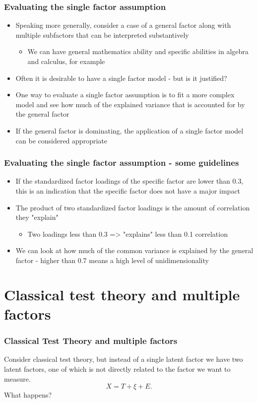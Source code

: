 \documentclass[compress]{beamer}
\begin{document}
\begin{frame}[fragile]
\frametitle{Evaluating the single factor assumption}
\begin{itemize}
\item Speaking more generally, consider a case of a general factor along with multiple subfactors that can be interpreted substantively
\begin{itemize}
\item We can have general mathematics ability and specific abilities in algebra and calculus, for example
\end{itemize} 
\item Often it is desirable to have a single factor model - but is it justified?
\item One way to evaluate a single factor assumption is to fit a more complex model and see how much of the explained variance that is accounted for by the general factor 
\item If the general factor is dominating, the application of a single factor model can be considered appropriate
\end{itemize}
\end{frame}

\begin{frame}[fragile]
\frametitle{Evaluating the single factor assumption - some guidelines}
\begin{itemize}
\item If the standardized factor loadings of the specific factor are lower than 0.3, this is an indication that the specific factor does not have a major impact
\item The product of two standardized factor loadings is the amount of correlation they "explain"
\begin{itemize}
\item Two loadings less than 0.3 => "explains" less than 0.1 correlation
\end{itemize}
\item We can look at how much of the common variance is explained by the general factor - higher than 0.7 means a high level of unidimensionality 
\end{itemize}
\end{frame}


\section*{Classical test theory and multiple factors}
\begin{frame}[fragile]
\frametitle{Classical Test Theory and multiple factors}
Consider classical test theory, but instead of a single latent factor we have two latent factors, one of which is not directly related to the factor we want to measure.
\[
X = T + \xi + E.
\]
What happens?
\end{frame}
\end{document}
